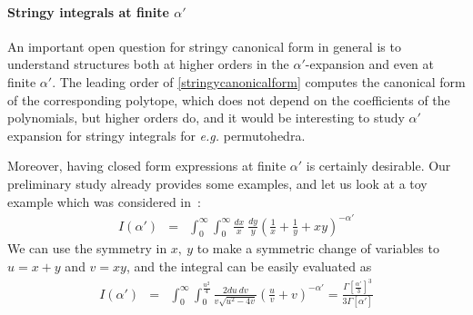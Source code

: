 \documentclass[hidelinks,12pt]{article}
\newcommand{\bea}[1]{\begin{eqnarray}\label{#1} }
\newcommand{\eea}{\end{eqnarray}}
\def\bea{\begin{eqnarray}}
\def\eea{\end{eqnarray}}
\begin{document}
\paragraph{Stringy integrals at finite $\alpha'$}

An important open question for stringy canonical form in general is to understand structures both at higher orders in the $\alpha'$-expansion and even at finite $\alpha'$. 
The leading order of \eqref{stringycanonicalform} computes the canonical form of the corresponding polytope, which does not depend on the coefficients of the polynomials, but higher orders do, and it would be interesting to study $\alpha'$ expansion for stringy integrals for {\it e.g.} permutohedra. 
 
Moreover, having closed form expressions at finite $\alpha'$ is certainly desirable. Our preliminary study already provides some examples, and let us look at a toy example which was considered in~\cite{Arkani-Hamed:2019mrd}:
 \bea
I(\alpha') &=& \int_{0}^{\infty} \int_{0}^{\infty} \frac{dx}{x} ~\frac{dy}{y} \left( \frac{1}{x} + \frac{1}{y}+ x y \right)^{-\alpha' } \nonumber 
\eea 
We can use the symmetry in $x,~y$ to make a symmetric change of variables to $u=x+y$ and $v =x y$, and the integral can be easily evaluated as
 \bea
I(\alpha') &=& \int_{0}^{\infty} \int_{0}^{\frac{u^2}{4}} \frac{2 du ~ dv}{v \sqrt{u^2-4 v} }\left( \frac{u}{v} + v  \right)^{-\alpha'}= \frac{\Gamma{\left[\frac{\alpha'}{3}\right]^{3}}}{3 \Gamma{ \left[\alpha'\right]}} \nonumber
\eea
%
\end{document}
